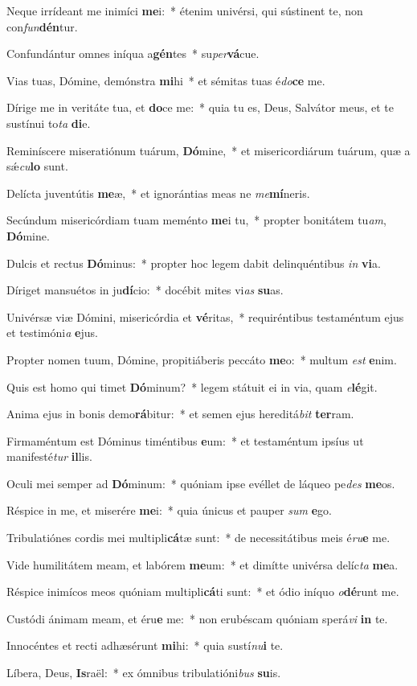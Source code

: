 \item Neque irrídeant me inimíci \textbf{me}i:~* étenim univérsi, qui sústinent te, non con\textit{fun}\textbf{dén}tur.
\item Confundántur omnes iníqua a\textbf{gén}tes~* su\textit{per}\textbf{vá}cue.
\item Vias tuas, Dómine, demónstra \textbf{mi}hi~* et sémitas tuas é\textit{do}\textbf{ce} me.
\item Dírige me in veritáte tua, et \textbf{do}ce me:~* quia tu es, Deus, Salvátor meus, et te sustínui to\textit{ta} \textbf{di}e.
\item Reminíscere miseratiónum tuárum, \textbf{Dó}mine,~* et misericordiárum tuárum, quæ a sǽ\textit{cu}\textbf{lo} sunt.
\item Delícta juventútis \textbf{me}æ,~* et ignorántias meas ne \textit{me}\textbf{mí}neris.
\item Secúndum misericórdiam tuam meménto \textbf{me}i tu,~* propter bonitátem tu\textit{am}, \textbf{Dó}mine.
\item Dulcis et rectus \textbf{Dó}minus:~* propter hoc legem dabit delinquéntibus \textit{in} \textbf{vi}a.
\item Díriget mansuétos in ju\textbf{dí}cio:~* docébit mites vi\textit{as} \textbf{su}as.
\item Univérsæ viæ Dómini, misericórdia et \textbf{vé}ritas,~* requiréntibus testaméntum ejus et testimóni\textit{a} \textbf{e}jus.
\item Propter nomen tuum, Dómine, propitiáberis peccáto \textbf{me}o:~* multum \textit{est} \textbf{e}nim.
\item Quis est homo qui timet \textbf{Dó}minum?~* legem státuit ei in via, quam \textit{e}\textbf{lé}git.
\item Anima ejus in bonis demo\textbf{rá}bitur:~* et semen ejus hereditá\textit{bit} \textbf{ter}ram.
\item Firmaméntum est Dóminus timéntibus \textbf{e}um:~* et testaméntum ipsíus ut manifesté\textit{tur} \textbf{il}lis.
\item Oculi mei semper ad \textbf{Dó}minum:~* quóniam ipse evéllet de láqueo pe\textit{des} \textbf{me}os.
\item Réspice in me, et miserére \textbf{me}i:~* quia únicus et pauper \textit{sum} \textbf{e}go.
\item Tribulatiónes cordis mei multipli\textbf{cá}tæ sunt:~* de necessitátibus meis é\textit{ru}\textbf{e} me.
\item Vide humilitátem meam, et labórem \textbf{me}um:~* et dimítte univérsa delíc\textit{ta} \textbf{me}a.
\item Réspice inimícos meos quóniam multipli\textbf{cá}ti sunt:~* et ódio iníquo \textit{o}\textbf{dé}runt me.
\item Custódi ánimam meam, et éru\textbf{e} me:~* non erubéscam quóniam sperá\textit{vi} \textbf{in} te.
\item Innocéntes et recti adhæsérunt \textbf{mi}hi:~* quia sustí\textit{nu}\textbf{i} te.
\item Líbera, Deus, \textbf{Is}raël:~* ex ómnibus tribulatióni\textit{bus} \textbf{su}is.
